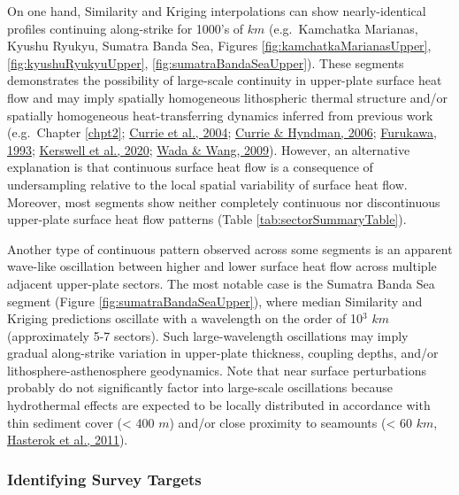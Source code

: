 On one hand, Similarity and Kriging interpolations can show nearly-identical profiles continuing along-strike for 1000's of \(km\) (e.g.~Kamchatka Marianas, Kyushu Ryukyu, Sumatra Banda Sea, Figures \ref{fig:kamchatkaMarianasUpper}, \ref{fig:kyushuRyukyuUpper}, \ref{fig:sumatraBandaSeaUpper}). These segments demonstrates the possibility of large-scale continuity in upper-plate surface heat flow and may imply spatially homogeneous lithospheric thermal structure and/or spatially homogeneous heat-transferring dynamics inferred from previous work (e.g.~Chapter \ref{chpt2}; \protect\hyperlink{ref-currie2004}{Currie et al., 2004}; \protect\hyperlink{ref-currie2006}{Currie \& Hyndman, 2006}; \protect\hyperlink{ref-furukawa1993}{Furukawa, 1993}; \protect\hyperlink{ref-kerswell2020}{Kerswell et al., 2020}; \protect\hyperlink{ref-wada2009}{Wada \& Wang, 2009}). However, an alternative explanation is that continuous surface heat flow is a consequence of undersampling relative to the local spatial variability of surface heat flow. Moreover, most segments show neither completely continuous nor discontinuous upper-plate surface heat flow patterns (Table \ref{tab:sectorSummaryTable}).

Another type of continuous pattern observed across some segments is an apparent wave-like oscillation between higher and lower surface heat flow across multiple adjacent upper-plate sectors. The most notable case is the Sumatra Banda Sea segment (Figure \ref{fig:sumatraBandaSeaUpper}), where median Similarity and Kriging predictions oscillate with a wavelength on the order of 10\(^3\) \(km\) (approximately 5-7 sectors). Such large-wavelength oscillations may imply gradual along-strike variation in upper-plate thickness, coupling depths, and/or lithosphere-asthenosphere geodynamics. Note that near surface perturbations probably do not significantly factor into large-scale oscillations because hydrothermal effects are expected to be locally distributed in accordance with thin sediment cover (\textless{} 400 \(m\)) and/or close proximity to seamounts (\textless{} 60 \(km\), \protect\hyperlink{ref-hasterok2011}{Hasterok et al., 2011}).

\hypertarget{identifying-survey-targets}{%
\subsubsection{Identifying Survey Targets}\label{identifying-survey-targets}}

